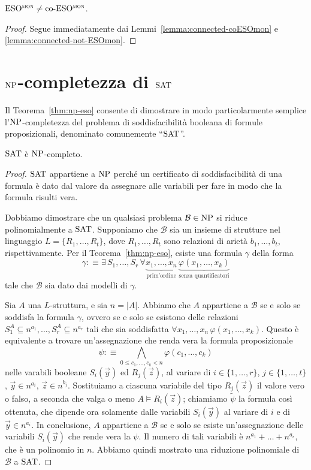 \begin{teorema}
  $\operatorname{ESO^{\normalfont\textsc{mon}}} \neq \operatorname{co-ESO^{\normalfont\textsc{mon}}}$.
\end{teorema}

\begin{proof}
  Segue immediatamente dai Lemmi~\ref{lemma:connected-coESOmon} e \ref{lemma:connected-not-ESOmon}.
\end{proof}




\section{\texorpdfstring{$\operatorname{NP}$}{NP}-completezza di \texorpdfstring{$\operatorname{SAT}$}{SAT}}

Il Teorema~\ref{thm:np-eso} consente di dimostrare in modo particolarmente semplice l'$\operatorname{NP}$-com\-ple\-tez\-za del problema di soddisfacibilità booleana di formule proposizionali, denominato comunemente ``$\operatorname{SAT}$''.

\begin{teorema}
  $\operatorname{SAT}$ è $\operatorname{NP}$-completo.
\end{teorema}

\begin{proof}
  $\operatorname{SAT}$ appartiene a $\operatorname{NP}$ perché un certificato di soddisfacibilità di una formula è dato dal valore da assegnare alle variabili per fare in modo che la formula risulti vera.
  
  Dobbiamo dimostrare che un qualsiasi problema $\mathcal{B}\in\operatorname{NP}$ si riduce polinomialmente a $\operatorname{SAT}$.
  Supponiamo che $\mathcal{B}$ sia un insieme di strutture nel linguaggio $L=\{R_1,\dots,R_t\}$, dove $R_1,\dots,R_t$ sono relazioni di arietà $b_1,\dots,b_t$, rispettivamente.
  Per il Teorema~\ref{thm:np-eso}, esiste una formula $\gamma$ della forma
  \[ \gamma :\equiv \exists\, S_1,\dots,S_r \, \forall \underbrace{x_1,\dots,x_n}_{\text{prim'ordine}} \, \underbrace{\varphi(x_1,\dots,x_k)}_{\text{senza quantificatori}} \]
  tale che $\mathcal{B}$ sia dato dai modelli di $\gamma$.
  
  Sia $A$ una $L$-struttura, e sia $n=|A|$. Abbiamo che $A$ appartiene a $\mathcal{B}$ se e solo se soddisfa la formula $\gamma$, ovvero se e solo se esistono delle relazioni $S_1^A\subseteq n^{a_1}, \dots, S_r^A\subseteq n^{a_r}$ tali che sia soddisfatta $\forall x_1,\dots,x_n \,\varphi(x_1,\dots,x_k)$.
  Questo è equivalente a trovare un'assegnazione che renda vera la formula proposizionale
  \[ \psi :\equiv \bigwedge_{0\leq c_1,\dots,c_k < n} \varphi(c_1,\dots,c_k) \]
  nelle varabili booleane $S_i(\vec{y})$ ed $R_j(\vec{z})$, al variare di $i\in \{1,\ldots,r\}$, $j\in\{1,\dots,t\}$, $\vec{y}\in n^{a_i}$, $\vec{z}\in n^{b_j}$.
  Sostituiamo a ciascuna variabile del tipo $R_j(\vec{z})$ il valore vero o falso, a seconda che valga o meno $A \models R_i(\vec{z})$; chiamiamo $\tilde\psi$ la formula così ottenuta, che dipende ora solamente dalle variabili $S_i(\vec{y})$ al variare di $i$ e di $\vec{y}\in n^{a_i}$.
  In conclusione, $A$ appartiene a $\mathcal{B}$ se e solo se esiste un'assegnazione delle variabili $S_i(\vec{y})$ che rende vera la $\psi$. Il numero di tali variabili è $n^{a_1}+\ldots+n^{a_r}$, che è un polinomio in $n$.
  Abbiamo quindi mostrato una riduzione polinomiale di $\mathcal{B}$ a $\operatorname{SAT}$.
\end{proof}
